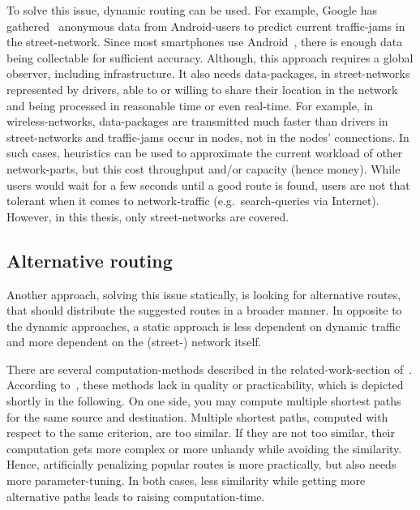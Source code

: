         To solve this issue, dynamic routing can be used.
        For example, Google has gathered~\cite{barth:google-traffic} anonymous data from Android-users to predict current traffic-jams in the street-network.
        Since most smartphones use Android~\cite{kantar:android-vs-ios}, there is enough data being collectable for sufficient accuracy.
        Although, this approach requires a global observer, including infrastructure.
        It also needs data-packages, in street-networks represented by drivers, able to or willing to share their location in the network and being processed in reasonable time or even real-time.
        For example, in wireless-networks, data-packages are transmitted much faster than drivers in street-networks and traffic-jams occur in nodes, not in the nodes' connections.
        In such cases, heuristics can be used to approximate the current workload of other network-parts, but this cost throughput and/or capacity (hence money).
        While users would wait for a few seconds until a good route is found, users are not that tolerant when it comes to network-traffic (e.g.\ search-queries via Internet).
        However, in this thesis, only street-networks are covered.

    \subsection{Alternative routing}

        Another approach, solving this issue statically, is looking for alternative routes, that should distribute the suggested routes in a broader manner.
        In opposite to the dynamic approaches, a static approach is less dependent on dynamic traffic and more dependent on the (street-) network itself.

        There are several computation-methods described in the related-work-section of~\cite{barth:alternative_routes}.
        According to~, these methods lack in quality or practicability, which is depicted shortly in the following.
        On one side, you may compute multiple shortest paths for the same source and destination.
        Multiple shortest paths, computed with respect to the same criterion, are too similar.
        If they are not too similar, their computation gets more complex or more unhandy while avoiding the similarity.
        Hence, artificially  penalizing popular routes is more practically, but also needs more parameter-tuning.
        In both cases, less similarity while getting more alternative paths leads to raising computation-time.

